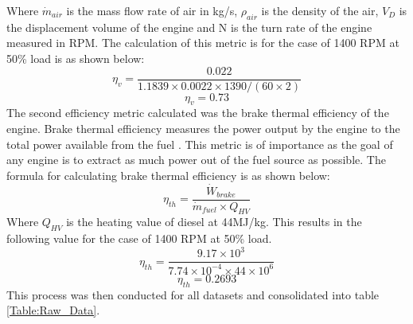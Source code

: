 \documentclass[12pt]{article}
\begin{document}
Where $\dot{m}_{air}$ is the mass flow rate of air in kg/s, $\rho_{air}$ is the density of the air, $V_D$ is the displacement volume of the engine and N is the turn rate of the engine measured in RPM. The calculation of this metric is for the case of 1400 RPM at 50\% load is as shown below:
\begin{equation*}
    \eta_{v} = \frac{0.022}{1.1839\times 0.0022 \times 1390/(60\times2)}
\end{equation*}
\begin{equation*}
    \eta_{v} = 0.73
\end{equation*}
The second efficiency metric calculated was the brake thermal efficiency of the engine. Brake thermal efficiency measures the power output by the engine to the total power available from the fuel \cite{INDRAWAN}. This metric is of importance as the goal of any engine is to extract as much power out of the fuel source as possible. The formula for calculating brake thermal efficiency is as shown below:
\begin{equation}
    \eta_{th} = \frac{\dot{W}_{brake}}{\dot{m}_{fuel}\times Q_{HV}}
\end{equation}
Where $Q_{HV}$ is the heating value of diesel at 44MJ/kg. This results in the following value for the case of 1400 RPM at 50\% load.
\begin{equation*}
    \eta_{th} = \frac{9.17\times10^3}{7.74\times10^{-4}\times 44\times10^6}
\end{equation*}
\begin{equation*}
    \eta_{th} = 0.2693
\end{equation*}
This process was then conducted for all datasets and consolidated into table \ref{Table:Raw_Data}.
\end{document}
